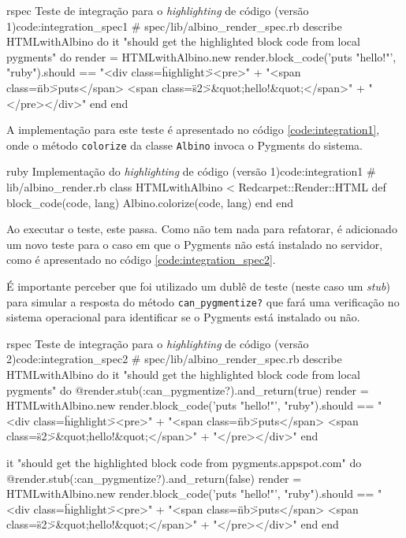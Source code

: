 \begin{mycode}{rspec}%
{Teste de integração para o \textit{highlighting} de código (versão 1)}{code:integration_spec1}
# spec/lib/albino_render_spec.rb
describe HTMLwithAlbino do
  it "should get the highlighted block code from local pygments" do
    render = HTMLwithAlbino.new
    render.block_code('puts "hello!"', "ruby").should ==
      "<div class=\"highlight\"><pre>" +
        "<span class=\"nb\">puts</span> <span class=\"s2\">&quot;hello!&quot;</span>\n" +
      "</pre>\n</div>\n"
  end
end
\end{mycode}

A implementação para este teste é apresentado no código \ref{code:integration1}, onde o método \texttt{colorize} da classe \texttt{Albino} invoca o Pygments do sistema.

\begin{mycode}{ruby}%
{Implementação do \textit{highlighting} de código (versão 1)}{code:integration1}
# lib/albino_render.rb
class HTMLwithAlbino < Redcarpet::Render::HTML
  def block_code(code, lang)
    Albino.colorize(code, lang)
  end
end
\end{mycode}

Ao executar o teste, este passa. Como não tem nada para refatorar, é adicionado um novo teste para o caso em que o Pygments não está instalado no servidor, como é apresentado no código \ref{code:integration_spec2}.

É importante perceber que foi utilizado um dublê de teste (neste caso um \textit{stub}) para simular a resposta do método \texttt{can\_pygmentize?} que fará uma verificação no sistema operacional para identificar se o Pygments está instalado ou não.

\begin{mycode}{rspec}%
{Teste de integração para o \textit{highlighting} de código (versão 2)}{code:integration_spec2}
# spec/lib/albino_render_spec.rb
describe HTMLwithAlbino do
  it "should get the highlighted block code from local pygments" do
    @render.stub(:can_pygmentize?).and_return(true)
    render = HTMLwithAlbino.new
    render.block_code('puts "hello!"', "ruby").should ==
      "<div class=\"highlight\"><pre>" +
        "<span class=\"nb\">puts</span> <span class=\"s2\">&quot;hello!&quot;</span>\n" +
      "</pre>\n</div>\n"
  end

  it "should get the highlighted block code from pygments.appspot.com" do
    @render.stub(:can_pygmentize?).and_return(false)
    render = HTMLwithAlbino.new
    render.block_code('puts "hello!"', "ruby").should ==
      "<div class=\"highlight\"><pre>" +
        "<span class=\"nb\">puts</span> <span class=\"s2\">&quot;hello!&quot;</span>\n" +
      "</pre>\n</div>\n"
  end
end
\end{mycode}

